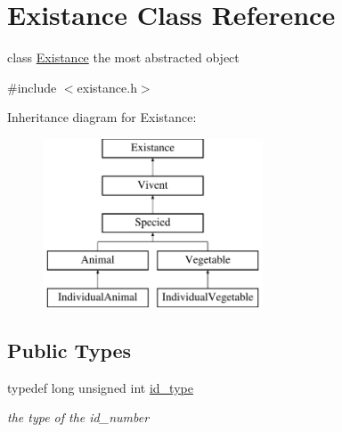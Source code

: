 \hypertarget{classExistance}{
\section{Existance Class Reference}
\label{classExistance}
}


class \hyperlink{classExistance}{Existance} the most abstracted object  




{\ttfamily \#include $<$existance.h$>$}

Inheritance diagram for Existance:\begin{figure}[H]
\begin{center}
\leavevmode
\includegraphics[height=5.000000cm]{classExistance}
\end{center}
\end{figure}
\subsection*{Public Types}
\begin{DoxyCompactItemize}
\item 
typedef long unsigned int \hyperlink{classExistance_a82c4092964457cd7da30d53072c62f1a}{id\_\-type}
\begin{DoxyCompactList}\small\item\em the type of the id\_\-number \end{DoxyCompactList}\end{DoxyCompactItemize}
